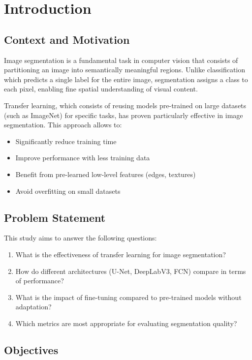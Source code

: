 \documentclass[12pt,a4paper]{article}
\begin{document}
\section{Introduction}

\subsection{Context and Motivation}

Image segmentation is a fundamental task in computer vision that consists of partitioning an image into semantically meaningful regions. Unlike classification which predicts a single label for the entire image, segmentation assigns a class to each pixel, enabling fine spatial understanding of visual content.

Transfer learning, which consists of reusing models pre-trained on large datasets (such as ImageNet) for specific tasks, has proven particularly effective in image segmentation. This approach allows to:
\begin{itemize}
    \item Significantly reduce training time
    \item Improve performance with less training data
    \item Benefit from pre-learned low-level features (edges, textures)
    \item Avoid overfitting on small datasets
\end{itemize}

\subsection{Problem Statement}

This study aims to answer the following questions:
\begin{enumerate}
    \item What is the effectiveness of transfer learning for image segmentation?
    \item How do different architectures (U-Net, DeepLabV3, FCN) compare in terms of performance?
    \item What is the impact of fine-tuning compared to pre-trained models without adaptation?
    \item Which metrics are most appropriate for evaluating segmentation quality?
\end{enumerate}

\subsection{Objectives}
\end{document}
